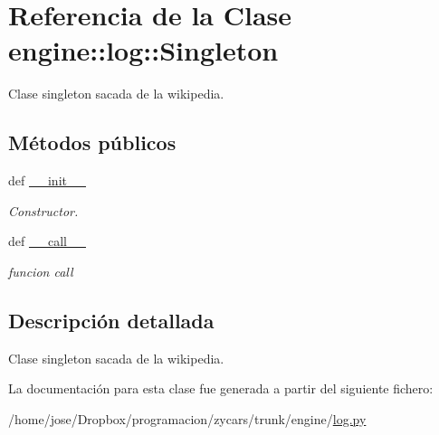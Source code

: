 \hypertarget{classengine_1_1log_1_1Singleton}{
\section{\-Referencia de la \-Clase engine\-:\-:log\-:\-:\-Singleton}
\label{classengine_1_1log_1_1Singleton}
}


\-Clase singleton sacada de la wikipedia.  


\subsection*{\-Métodos públicos}
\begin{DoxyCompactItemize}
\item 
\hypertarget{classengine_1_1log_1_1Singleton_ae86f35dfc2dcbe71efeacda0dcca901f}{
def \hyperlink{classengine_1_1log_1_1Singleton_ae86f35dfc2dcbe71efeacda0dcca901f}{\-\_\-\-\_\-init\-\_\-\-\_\-}}
\label{classengine_1_1log_1_1Singleton_ae86f35dfc2dcbe71efeacda0dcca901f}

\begin{DoxyCompactList}\small\item\em \-Constructor. \end{DoxyCompactList}\item 
\hypertarget{classengine_1_1log_1_1Singleton_aaf2c133bb76e7f870a4ef70f9316bd7c}{
def \hyperlink{classengine_1_1log_1_1Singleton_aaf2c133bb76e7f870a4ef70f9316bd7c}{\-\_\-\-\_\-call\-\_\-\-\_\-}}
\label{classengine_1_1log_1_1Singleton_aaf2c133bb76e7f870a4ef70f9316bd7c}

\begin{DoxyCompactList}\small\item\em funcion call \end{DoxyCompactList}\end{DoxyCompactItemize}


\subsection{\-Descripción detallada}
\-Clase singleton sacada de la wikipedia. 

\-La documentación para esta clase fue generada a partir del siguiente fichero\-:\begin{DoxyCompactItemize}
\item 
/home/jose/\-Dropbox/programacion/zycars/trunk/engine/\hyperlink{log_8py}{log.\-py}\end{DoxyCompactItemize}
